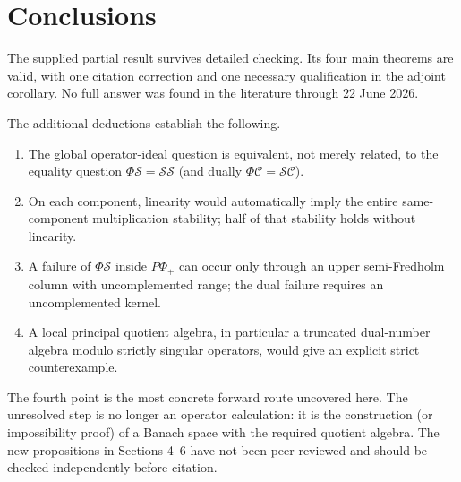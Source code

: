 \documentclass[11pt]{article}
\theoremstyle{definition}
\newcommand{\SSing}{\mathcal{SS}}
\newcommand{\SCos}{\mathcal{SC}}
\newcommand{\PhiS}{\Phi\mathcal S}
\newcommand{\PhiC}{\Phi\mathcal C}
\newcommand{\PPhiP}{P\Phi_+}
\begin{document}
\section{Conclusions}

The supplied partial result survives detailed checking.  Its four main theorems are valid,
with one citation correction and one necessary qualification in the adjoint corollary.  No
full answer was found in the literature through 22 June 2026.

The additional deductions establish the following.
\begin{enumerate}[leftmargin=2em]
\item The global operator-ideal question is equivalent, not merely related, to the equality
question \(\PhiS=\SSing\) (and dually \(\PhiC=\SCos\)).
\item On each component, linearity would automatically imply the entire same-component
multiplication stability; half of that stability holds without linearity.
\item A failure of \(\PhiS\) inside \(\PPhiP\) can occur only through an upper
semi-Fredholm column with uncomplemented range; the dual failure requires an
uncomplemented kernel.
\item A local principal quotient algebra, in particular a truncated dual-number algebra
modulo strictly singular operators, would give an explicit strict counterexample.
\end{enumerate}

The fourth point is the most concrete forward route uncovered here.  The unresolved step
is no longer an operator calculation: it is the construction (or impossibility proof) of a
Banach space with the required quotient algebra.  The new propositions in Sections 4--6
have not been peer reviewed and should be checked independently before citation.
\end{document}
